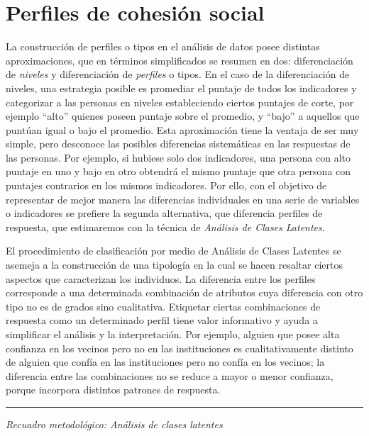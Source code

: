 \documentclass[
  12pt,
]{book}
\begin{document}
\hypertarget{perfiles-de-cohesiuxf3n-social}{%
\section{Perfiles de cohesión social}\label{perfiles-de-cohesiuxf3n-social}}

La construcción de perfiles o tipos en el análisis de datos posee distintas aproximaciones, que en términos simplificados se resumen en dos: diferenciación de \emph{niveles} y diferenciación de \emph{perfiles} o tipos. En el caso de la diferenciación de niveles, una estrategia posible es promediar el puntaje de todos los indicadores y categorizar a las personas en niveles estableciendo ciertos puntajes de corte, por ejemplo ``alto'' quienes poseen puntaje sobre el promedio, y ``bajo'' a aquellos que puntúan igual o bajo el promedio. Esta aproximación tiene la ventaja de ser muy simple, pero desconoce las posibles diferencias sistemáticas en las respuestas de las personas. Por ejemplo, si hubiese solo dos indicadores, una persona con alto puntaje en uno y bajo en otro obtendrá el mismo puntaje que otra persona con puntajes contrarios en los mismos indicadores. Por ello, con el objetivo de representar de mejor manera las diferencias individuales en una serie de variables o indicadores se prefiere la segunda alternativa, que diferencia perfiles de respuesta, que estimaremos con la técnica de \emph{Análisis de Clases Latentes}.

El procedimiento de clasificación por medio de Análisis de Clases Latentes se asemeja a la construcción de una tipología en la cual se hacen resaltar ciertos aspectos que caracterizan los individuos. La diferencia entre los perfiles corresponde a una determinada combinación de atributos cuya diferencia con otro tipo no es de grados sino cualitativa. Etiquetar ciertas combinaciones de respuesta como un determinado perfil tiene valor informativo y ayuda a simplificar el análisis y la interpretación. Por ejemplo, alguien que posee alta confianza en los vecinos pero no en las instituciones es cualitativamente distinto de alguien que confía en las instituciones pero no confía en los vecinos; la diferencia entre las combinaciones no se reduce a mayor o menor confianza, porque incorpora distintos patrones de respuesta.

\begin{center}\rule{0.5\linewidth}{0.5pt}\end{center}

\emph{Recuadro metodológico: Análisis de clases latentes}
\end{document}
